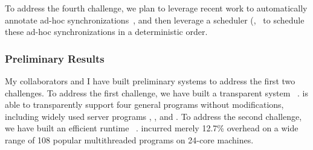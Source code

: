 To address the fourth challenge, we plan to leverage recent work to 
automatically annotate ad-hoc synchronizations~\cite{syncfinder:osdi10, 
cfix:osdi12}, and then leverage a \dmt scheduler (\eg,~\cite{dthreads:sosp11, 
parrot:sosp13} to schedule these ad-hoc synchronizations in a deterministic 
order.









\vspace{-.15in}\subsubsection{Preliminary Results} 
\label{sec:defense-result}\vspace{-.075in}

My collaborators and I have built preliminary systems to address the first two 
challenges. To address the first challenge, we have built a transparent \smr 
system \crane~\cite{crane:sosp15}. \crane is able to transparently support four 
general programs without modifications, including widely used server programs 
\apache, \mysql, and \clamav. To address the second challenge, we have built an 
efficient \dmt runtime \parrot~\cite{parrot:sosp13}. \parrot incurred merely 
12.7\% overhead on a wide range of 108 popular multithreaded programs on 
24-core machines.

